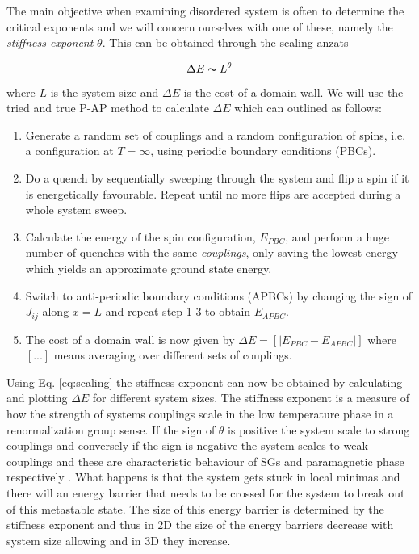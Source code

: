 \documentclass[paper=a4, fontsize=11pt]{scrartcl} %
\numberwithin{equation}{section} %
\numberwithin{figure}{section} %
\numberwithin{table}{section} %
\newcommand{\commutator}[1]{\ensuremath{\left[ #1 \right]}}
\begin{document}
The main objective when examining disordered system is often to determine the critical exponents and we will concern ourselves with one of these, namely the \emph{stiffness exponent} $\theta$. This can be obtained through the scaling anzats

\begin{equation}
\Delta E \thicksim L^\theta
\label{eq:scaling}
\end{equation}
where $L$ is the system size and $\Delta E$ is the cost of a domain wall. We will use the tried and true P-AP method\cite{hartmann}\cite{carter} to calculate $\Delta E$ which can outlined as follows:

\begin{enumerate}
\item Generate a random set of couplings and a random configuration of spins, i.e. a configuration at $T=\infty$, using periodic boundary conditions (PBCs).
\item Do a quench by sequentially sweeping through the system and flip a spin if it is energetically favourable. Repeat until no more flips are accepted during a whole system sweep.
\item Calculate the energy of the spin configuration, $E_{PBC}$, and perform a huge number of quenches with the same \emph{couplings}, only saving the lowest energy which yields an approximate ground state energy.
\item Switch to anti-periodic boundary conditions (APBCs) by changing the sign of $J_{ij}$ along $x=L$ and repeat step 1-3 to obtain $E_{APBC}$.
\item The cost of a domain wall is now given by $\Delta E = \commutator{|E_{PBC}-E_{APBC}|}$ where $[...]$ means averaging over different sets of couplings.
\end{enumerate}
Using Eq. \eqref{eq:scaling} the stiffness exponent can now be obtained by calculating and plotting $\Delta E$ for different system sizes. The stiffness exponent is a measure of how the strength of systems couplings scale in the low temperature phase in a renormalization group sense. If the sign of $\theta$ is positive the system scale to strong couplings and conversely if the sign is negative the system scales to weak couplings and these are characteristic behaviour of SGs and paramagnetic phase respectively \cite{almeida}. What happens is that the system gets stuck in local minimas and there will an energy barrier that needs to be crossed for the system to break out of this metastable state. The size of this energy barrier is determined by the stiffness exponent and thus in 2D the size of the energy barriers decrease with system size allowing and in 3D they increase. 
\end{document}
